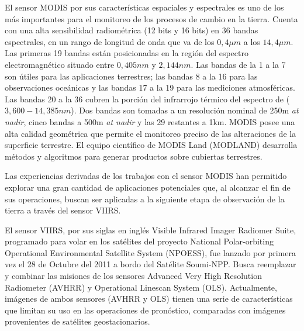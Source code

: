 El sensor MODIS por sus características espaciales y espectrales es uno de los más importantes para el monitoreo de los procesos de cambio en la tierra. Cuenta con una alta sensibilidad radiométrica (12 bits y 16 bits) en 36 bandas espectrales, en un rango de longitud de onda que va de los $0,4 \mu m$ a los $14,4 \mu m$. Las primeras 19 bandas están posicionadas en la región del espectro electromagnético situado entre $0, 405 nm$ y $2, 144 nm$. Las bandas de la 1 a la 7 son útiles para las aplicaciones terrestres; las bandas 8 a la 16 para las observaciones oceánicas y las bandas 17 a la 19 para las mediciones atmosféricas. Las bandas 20 a la 36 cubren la porción del infrarrojo térmico del espectro de ($3, 600 -  14, 385 nm$). Dos bandas son tomadas a un resolución nominal de 250m \textit{at nadir}, cinco bandas a 500m \textit{at nadir} y las 29 restantes a 1km. MODIS posee una alta calidad geométrica que permite el monitoreo preciso de las alteraciones de la superficie terrestre. El equipo científico de MODIS Land (MODLAND) desarrolla métodos y algoritmos para generar productos sobre cubiertas terrestres.

Las experiencias derivadas de los trabajos con el sensor MODIS han permitido explorar una gran cantidad de aplicaciones potenciales que, al alcanzar el fin de sus operaciones, buscan ser aplicadas a la siguiente etapa de observación de la tierra a través del sensor VIIRS.

El sensor VIIRS, por sus siglas en inglés Visible Infrared Imager Radiomer Suite, programado para volar en los satélites del proyecto National Polar-orbiting  Operational Environmental Satellite System (NPOESS), fue lanzado por primera vez el 28 de Octubre del 2011 a bordo del Satélite Soumi-NPP. Busca reemplazar y combinar las misiones de los sensores Advanced Very High Resolution Radiometer (AVHRR) y Operational Linescan System (OLS). Actualmente, imágenes de ambos sensores (AVHRR y OLS) tienen una serie de características que limitan su uso  en las operaciones de pronóstico, comparadas con imágenes provenientes de satélites geostacionarios. 

